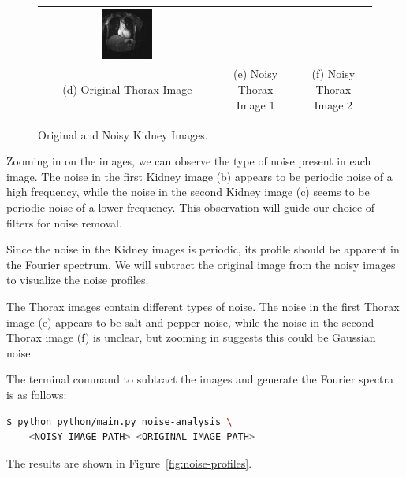 \documentclass[a4paper,12pt]{article}
\begin{document}
\begin{figure}[hbtp]
\begin{tabular}{ccc}
        \includegraphics[width=0.3\textwidth]{data/input/Thorax-Noise2.png} \\
        (d) Original Thorax Image & (e) Noisy Thorax Image 1 & (f) Noisy Thorax Image 2 \\
    \end{tabular}
    \caption{\label{fig:kidney-images} Original and Noisy Kidney Images.}
\end{figure}

Zooming in on the images, we can observe the type of noise present in each image. The noise in the first Kidney image (b) appears to be periodic noise of a high frequency, while the noise in the second Kidney image (c) seems to be periodic noise of a lower frequency. This observation will guide our choice of filters for noise removal.

Since the noise in the Kidney images is periodic, its profile should be apparent in the Fourier spectrum. We will subtract the original image from the noisy images to visualize the noise profiles.

The Thorax images contain different types of noise. The noise in the first Thorax image (e) appears to be salt-and-pepper noise, while the noise in the second Thorax image (f) is unclear, but zooming in suggests this could be Gaussian noise.

The terminal command to subtract the images and generate the Fourier spectra is as follows:

\begin{lstlisting}[language=bash]
$ python python/main.py noise-analysis \
    <NOISY_IMAGE_PATH> <ORIGINAL_IMAGE_PATH>
\end{lstlisting}

The results are shown in Figure~\ref{fig:noise-profiles}.
\end{document}
